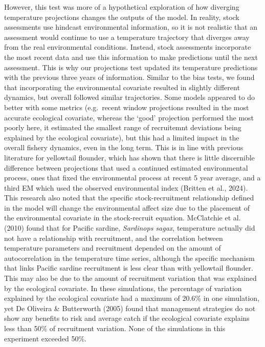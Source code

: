 \documentclass[
  12pt,
]{article}
\begin{document}
However, this test was more of a hypothetical exploration of how diverging temperature projections changes the outputs of the model. In reality, stock assessments use hindcast environmental information, so it is not realistic that an assessment would continue to use a temperature trajectory that diverges away from the real environmental conditions. Instead, stock assessments incorporate the most recent data and use this information to make predictions until the next assessment. This is why our projections test updated its temperature predictions with the previous three years of information. Similar to the bias tests, we found that incorporating the environmental covariate resulted in slightly different dynamics, but overall followed similar trajectories. Some models appeared to do better with some metrics (e.g.~recent window projections resulted in the most accurate ecological covariate, whereas the `good' projection performed the most poorly here, it estimated the smallest range of recruitemnt deviations being explained by the ecological covariate), but this had a limited impact in the overall fishery dynamics, even in the long term. This is in line with previous literature for yellowtail flounder, which has shown that there is little discernible difference between projections that used a continued estimated environmental process, ones that fixed the environmental process at recent 5 year average, and a third EM which used the observed environmental index (Britten et al., 2024). This research also noted that the specific stock-recruitment relationship defined in the model will change the environmental affect size due to the placement of the environmental covariate in the stock-recruit equation. McClatchie et al. (2010) found that for Pacific sardine, \emph{Sardinops sagax}, temperature actually did not have a relationship with recruitment, and the correlation between temperature parameters and recruitment depended on the amount of autocorrelation in the temperature time series, although the specific mechanism that links Pacific sardine recruitment is less clear than with yellowtail flounder. This may also be due to the amount of recruitment variation that was explained by the ecological covariate. In these simulations, the percentage of variation explained by the ecological covariate had a maximum of 20.6\% in one simulation, yet De Oliveira \& Butterworth (2005) found that management strategies do not show any benefits to risk and average catch if the ecological covariate explains less than 50\% of recruitment variation. None of the simulations in this experiment exceeded 50\%.
\end{document}
